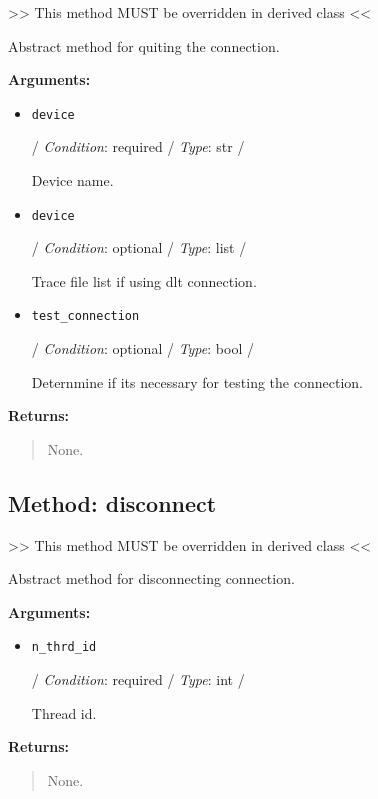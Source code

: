 \textgreater\textgreater{} This method MUST be overridden in derived
class \textless\textless{}

Abstract method for quiting the connection.

\textbf{Arguments:}

\begin{itemize}
\item
  \texttt{device}

  / \emph{Condition}: required / \emph{Type}: str /

  Device name.
\item
  \texttt{device}

  / \emph{Condition}: optional / \emph{Type}: list /

  Trace file list if using dlt connection.
\item
  \texttt{test\_connection}

  / \emph{Condition}: optional / \emph{Type}: bool /

  Deternmine if it\textquotesingle s necessary for testing the
  connection.
\end{itemize}

\textbf{Returns:}

\begin{quote}
None.
\end{quote}

\hypertarget{qconnectbase-connection-base-method-disconnect-9}{%
\subsection{Method: disconnect}\label{qconnectbase-connection-base-method-disconnect-9}}

\textgreater\textgreater{} This method MUST be overridden in derived
class \textless\textless{}

Abstract method for disconnecting connection.

\textbf{Arguments:}

\begin{itemize}
\item
  \texttt{n\_thrd\_id}

  / \emph{Condition}: required / \emph{Type}: int /

  Thread id.
\end{itemize}

\textbf{Returns:}

\begin{quote}
None.
\end{quote}

